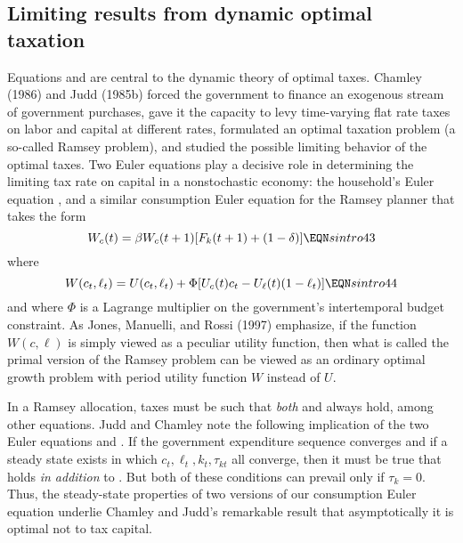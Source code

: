 \subsection{Limiting results from dynamic optimal taxation}
Equations  and  are central to the
dynamic theory of optimal taxes. Chamley (1986) and Judd (1985b)
%
forced the
government to finance an exogenous stream of government purchases,
gave it the capacity to levy time-varying flat rate taxes on labor
and capital at different rates, formulated an optimal taxation
problem (a so-called Ramsey problem), and studied the possible
limiting behavior of the optimal taxes. Two Euler  equations play
a decisive role in determining the limiting tax rate on capital in
a nonstochastic economy:  the household's Euler equation
, and  a similar consumption Euler equation for the
Ramsey planner that takes the form
$$ W_c(t) = \beta W_c(t+1) [F_k(t+1) + (1-\delta) ]\EQN sintro43 $$
where
$$ W(c_t, \ell_t) = U(c_t,\ell_t) + \Phi[U_c(t) c_t - U_\ell(t) (1-\ell_t) ]
  \EQN sintro44 $$
and where $\Phi$ is a Lagrange multiplier on the government's
intertemporal budget constraint. As Jones, Manuelli, and Rossi
(1997) emphasize,
%
 if the function $W(c,\ell)$ is simply viewed
as a peculiar utility function, then what is called the primal
version of the Ramsey problem can    be viewed as an ordinary
optimal growth problem with period utility function $W$ instead of
$U$.


In a Ramsey allocation, taxes must be such that {\it both\/}
 and  always hold, among other equations.
Judd and Chamley note the following implication of the two
Euler equations   and .
If the government expenditure sequence converges and if
a steady state exists in which $c_t, \ell_t, k_t, \tau_{kt}$ all converge,
then it must be true that  holds {\it in addition\/}
 to  .
But both of these conditions can prevail only
if $\tau_k =0$.   Thus, the steady-state properties of two versions of our consumption
Euler  equation  underlie Chamley and Judd's remarkable result
that asymptotically it is optimal not to tax capital.

